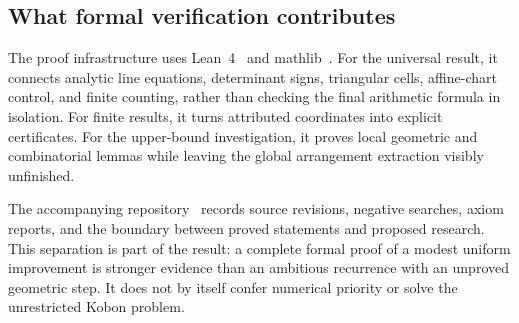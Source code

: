 \subsection{What formal verification contributes}

The proof infrastructure uses Lean~4~\citep{lean4} and mathlib~\citep{mathlib}. For the universal result, it connects analytic line equations, determinant signs, triangular cells, affine-chart control, and finite counting, rather than checking the final arithmetic formula in isolation. For finite results, it turns attributed coordinates into explicit certificates. For the upper-bound investigation, it proves local geometric and combinatorial lemmas while leaving the global arrangement extraction visibly unfinished.

The accompanying repository~\citep{zarzueloRepository} records source revisions, negative searches, axiom reports, and the boundary between proved statements and proposed research. This separation is part of the result: a complete formal proof of a modest uniform improvement is stronger evidence than an ambitious recurrence with an unproved geometric step. It does not by itself confer numerical priority or solve the unrestricted Kobon problem.
